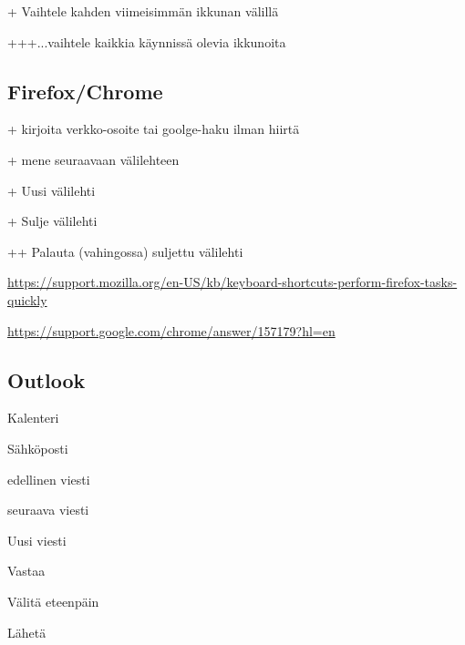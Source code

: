 \documentclass[a5paper,9pt]{scrartcl}
\begin{document}
    + Vaihtele kahden viimeisimmän ikkunan välillä
    
    +++...vaihtele kaikkia käynnissä olevia ikkunoita
    
    \subsection{Firefox/Chrome}
    
    \indent
    
    + kirjoita verkko-osoite tai goolge-haku ilman hiirtä
    
    + mene seuraavaan välilehteen
    
    + Uusi välilehti
    
    + Sulje välilehti
    
    ++ Palauta (vahingossa) suljettu välilehti

    
    
	\url{https://support.mozilla.org/en-US/kb/keyboard-shortcuts-perform-firefox-tasks-quickly}
	
	
	

    
    \url{https://support.google.com/chrome/answer/157179?hl=en}
    
    
	\subsection{Outlook}
	
	\indent
	
	 Kalenteri
	
	 Sähköposti
	
	\keys{\ctrl + ,} edellinen viesti
	
	 seuraava viesti
	
	 Uusi viesti
	
	 Vastaa
	
	 Välitä eteenpäin
	
	\keys{\ctrl + \return} Lähetä
	
	\medskip
	
\end{document}
